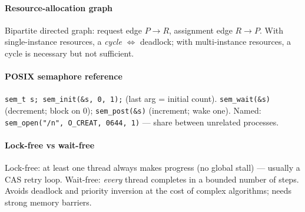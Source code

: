 \paragraph{Resource-allocation graph}
Bipartite directed graph: \textcolor{Bittersweet}{request edge} $P\to R$, \textcolor{Bittersweet}{assignment edge} $R\to P$. With single-instance resources, a \emph{cycle} $\Leftrightarrow$ deadlock; with multi-instance resources, a cycle is necessary but not sufficient.

\paragraph{POSIX semaphore reference}
\texttt{sem\_t s; sem\_init(\&s, 0, 1);} (last arg = initial count).
\texttt{sem\_wait(\&s)} (decrement; block on 0); \texttt{sem\_post(\&s)} (increment; wake one).
Named: \texttt{sem\_open("/n", O\_CREAT, 0644, 1)} — share between unrelated processes.

\paragraph{Lock-free vs wait-free}
\textcolor{Bittersweet}{Lock-free}: at least one thread always makes progress (no global stall) — usually a CAS retry loop. \textcolor{Bittersweet}{Wait-free}: \emph{every} thread completes in a bounded number of steps. Avoids deadlock and priority inversion at the cost of complex algorithms; needs strong memory barriers.
